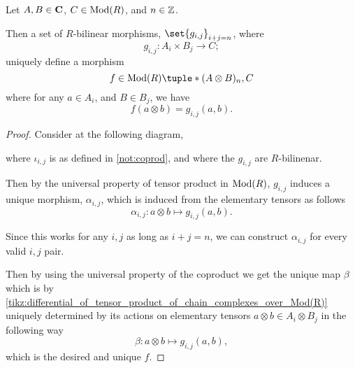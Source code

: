 \begin{lemma}
    \label{lem:map_out_of_tensor_unique}
    Let \( A, B \in \operatorname{\mathbf{C}} \), \( C \in \operatorname{Mod}(R) \), and \( n \in {\mathbb{Z}} \).

    Then a set of \( R \)-bilinear morphisms, \( \set{g_{i, j}}_{i + j = n} \), where
    \[
        g_{i, j}: A_i \times B_j \to C;
    \]
    uniquely define a morphism
    \[
        f \in \Mod(R)\tuple*{(A \otimes B)_n, C}
    \]
    where for any \( a \in A_i \), and \( B \in B_j \), we have
    \[
        f(a \otimes b) = g_{i, j}(a, b).
    \]
\end{lemma}
\begin{proof}
    Consider at the following diagram,
    \begin{diagramlabel}[\label{tikz:differential_of_tensor_product_of_chain_complexes_over_Mod(R)}]
    \end{diagramlabel}
    where \( \iota_{i, j} \) is as defined in \autoref{not:coprod}, and where the \( g_{i, j} \) are \( R \)-bilinenar.

    Then by the universal property of tensor product in \( \operatorname{Mod}(R) \), \( g_{i, j} \) induces a unique morphism, \( \alpha_{i, j} \), which is induced from the elementary tensors as follows
    \[
        \alpha_{i, j}: a \otimes b \mapsto g_{i, j}(a, b).
    \]

    Since this works for any \( i, j \) as long as \( i + j = n \), we can construct \( \alpha_{i, j} \) for every valid \( i, j \) pair.

    Then by using the universal property of the coproduct we get the unique map \( \beta \) which is by \autoref{tikz:differential_of_tensor_product_of_chain_complexes_over_Mod(R)} uniquely determined by its actions on elementary tensors \( a \otimes b \in A_i \otimes B_j \) in the following way
    \[
        \beta: a \otimes b \mapsto g_{i, j}(a, b),
    \]
    which is the desired and unique \( f \).
\end{proof}

